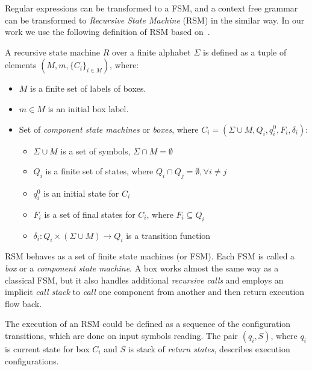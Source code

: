 Regular expressions can be transformed to a FSM, and a context free grammar can be transformed to \textit{Recursive State Machine} (RSM) in the similar way.
In our work we use the following definition of RSM based
on~\cite{rsm:analysis:10.1007/3-540-44585-4_18}.

\begin{definition}
A recursive state machine $R$ over a finite alphabet $\Sigma$ is defined as a tuple of elements $(M,m,\{C_i\}_{i \in M})$, where:

\begin{itemize}
    \item $M$ is a finite set of labels of boxes.
    \item $m \in M$ is an initial box label.
    \item Set of \textit{component state machines} or \textit{boxes},
          where $C_i=(\Sigma \cup M, Q_i,q_i^0,F_i,\delta_i)$:
    \begin{itemize}
        \item $\Sigma \cup M$ is a set of symbols, $\Sigma \cap M = \emptyset$
        \item $Q_i$ is a finite set of states,
              where $Q_i \cap Q_j = \emptyset, \forall i \neq j$
        \item $q_i^0$ is an initial state for $C_i$
        \item $F_i$ is a set of final states for $C_i$, where $F_i \subseteq Q_i$
        \item $\delta_i: Q_i \times (\Sigma \cup M) \to Q_i$ is a transition function %
    \end{itemize}
\end{itemize}

\end{definition}

RSM behaves as a set of finite state machines (or FSM).
Each FSM is called a \textit{box} or a \textit{component state machine}.
A box works almost the same way as a classical FSM, but it also handles additional \textit{recursive calls} and employs an implicit \textit{call stack} to \textit{call} one component from another and then return execution flow back.

The execution of an RSM could be defined as a sequence of the configuration transitions, which are done on input symbols reading. 
The pair $(q_i,S)$, where $q_i$ is current state for box $C_i$ and $S$ is stack of \textit{return states}, describes execution configurations. 

